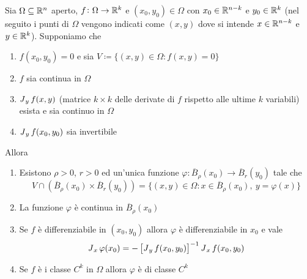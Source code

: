\begin{thm}
	Sia $ \Omega \subseteq \mathbb{R}^n $ aperto, $ f \colon \Omega \to \mathbb{R}^k $ e $ (x_0, y_0) \in \Omega $ con $ x_0 \in \mathbb{R}^{n - k} $ e $ y_0 \in \mathbb{R}^k $ (nel seguito i punti di $ \Omega $ vengono indicati come $ (x, y) $ dove si intende $ x \in \mathbb{R}^{n - k} $ e $ y \in \mathbb{R}^k $). Supponiamo che
	\begin{enumerate}[label = (\roman*)]
		\item $ f(x_0, y_0) = 0 $ e sia $ V \coloneqq \{(x, y) \in \Omega : f(x, y) = 0\} $
		\item $ f $ sia continua in $ \Omega $
		\item $ \operatorname{\mathit{J}}_y{f}(x, y) $ (matrice $ k \times k $ delle derivate di $ f $ rispetto alle ultime $ k $ variabili) esista e sia continuo in $ \Omega $
		\item $ \operatorname{\mathit{J}}_y{f}(x_0, y_0) $ sia invertibile
	\end{enumerate}
	Allora
	\begin{enumerate}[label = (\arabic*)]
		\item Esistono $ \rho > 0 $, $ r > 0 $ ed un'unica funzione $ \varphi \colon \overline{B}_{\rho}(x_0) \to \overline{B}_{r}(y_0) $ tale che
		\[
		V \cap (\overline{B}_{\rho}(x_0) \times \overline{B}_{r}(y_0)) = \{(x, y) \in \Omega : x \in \overline{B}_{\rho}(x_0) , \ y = \varphi(x)\}
		\]
		\item La funzione $ \varphi $ è continua in $ \overline{B}_{\rho}(x_0) $
		\item Se $ f $ è differenziabile in $ (x_0, y_0) $ allora $ \varphi $ è differenziabile in $ x_0 $ e vale
		\begin{equation}
			\operatorname{\mathit{J}}_x{\varphi}(x_0) = - \left[\operatorname{\mathit{J}}_y{f}(x_0, y_0)\right]^{-1} \operatorname{\mathit{J}}_x{f}(x_0, y_0)
		\end{equation}
		\item Se $ f $ è i classe $ C^k $ in $ \Omega $ allora $ \varphi $ è di classe $ C^k $ 
	\end{enumerate} 
\end{thm}

